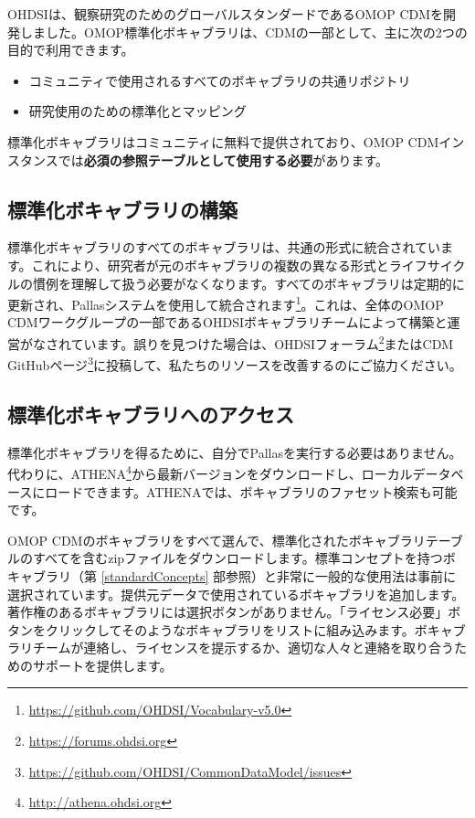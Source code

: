 \documentclass[
  11pt]{book}
\theoremstyle{definition}
\theoremstyle{definition}
\theoremstyle{definition}
\theoremstyle{definition}
\theoremstyle{remark}
\begin{document}
OHDSIは、観察研究のためのグローバルスタンダードであるOMOP CDMを開発しました。OMOP標準化ボキャブラリは、CDMの一部として、主に次の2つの目的で利用できます。

\begin{itemize}
\item
  コミュニティで使用されるすべてのボキャブラリの共通リポジトリ
\item
  研究使用のための標準化とマッピング
\end{itemize}

標準化ボキャブラリはコミュニティに無料で提供されており、OMOP CDMインスタンスでは\textbf{必須の参照テーブルとして使用する必要}があります。

\subsection{標準化ボキャブラリの構築}\label{ux6a19ux6e96ux5316ux30dcux30adux30e3ux30d6ux30e9ux30eaux306eux69cbux7bc9}

標準化ボキャブラリのすべてのボキャブラリは、共通の形式に統合されています。これにより、研究者が元のボキャブラリの複数の異なる形式とライフサイクルの慣例を理解して扱う必要がなくなります。すべてのボキャブラリは定期的に更新され、Pallasシステムを使用して統合されます\footnote{\url{https://github.com/OHDSI/Vocabulary-v5.0}}。これは、全体のOMOP CDMワークグループの一部であるOHDSIボキャブラリチームによって構築と運営がなされています。誤りを見つけた場合は、OHDSIフォーラム\footnote{\url{https://forums.ohdsi.org}}またはCDM GitHubページ\footnote{\url{https://github.com/OHDSI/CommonDataModel/issues}}に投稿して、私たちのリソースを改善するのにご協力ください。 

\subsection{標準化ボキャブラリへのアクセス}\label{accessVocabularies}

標準化ボキャブラリを得るために、自分でPallasを実行する必要はありません。代わりに、ATHENA\footnote{\url{http://athena.ohdsi.org}}から最新バージョンをダウンロードし、ローカルデータベースにロードできます。ATHENAでは、ボキャブラリのファセット検索も可能です。   

OMOP CDMのボキャブラリをすべて選んで、標準化されたボキャブラリテーブルのすべてを含むzipファイルをダウンロードします。標準コンセプトを持つボキャブラリ（第 \ref{standardConcepts} 部参照）と非常に一般的な使用法は事前に選択されています。提供元データで使用されているボキャブラリを追加します。著作権のあるボキャブラリには選択ボタンがありません。「ライセンス必要」ボタンをクリックしてそのようなボキャブラリをリストに組み込みます。ボキャブラリチームが連絡し、ライセンスを提示するか、適切な人々と連絡を取り合うためのサポートを提供します。
\end{document}
